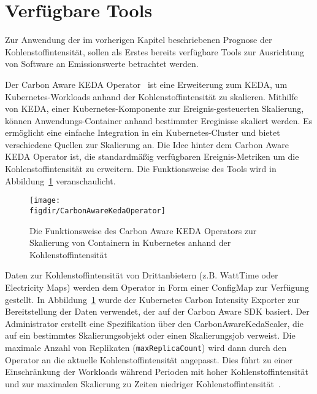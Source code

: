 \section{Verfügbare Tools}\label{CAP:tools}
Zur Anwendung der im vorherigen Kapitel beschriebenen Prognose der Kohlenstoffintensität, sollen als Erstes bereits verfügbare Tools zur Ausrichtung von Software an Emissionswerte betrachtet werden.

Der Carbon Aware KEDA Operator~\cite{Azure.20240321T11:03:47.000Z} ist eine Erweiterung zum \ac{KEDA}, um Kubernetes-Workloads anhand der Kohlenstoffintensität zu skalieren.
Mithilfe von \ac{KEDA}, einer Kubernetes-Komponente zur Ereignis-gesteuerten Skalierung, können Anwendungs-Container anhand bestimmter Ereginisse skaliert werden.
Es ermöglicht eine einfache Integration in ein Kubernetes-Cluster und bietet verschiedene Quellen zur Skalierung an.
Die Idee hinter dem Carbon Aware \ac{KEDA} Operator ist, die standardmäßig verfügbaren Ereignis-Metriken um die Kohlenstoffintensität zu erweitern.
Die Funktionsweise des Tools wird in Abbildung~\ref{FIG:carbon-aware-keda-operator} veranschaulicht.
\begin{figure}
 \caption{Die Funktionsweise des Carbon Aware KEDA Operators zur Skalierung von Containern in Kubernetes anhand der Kohlenstoffintensität~\cite{Azure.20240321T11:03:47.000Z}}
 {\texttt{[image: \\figdir/CarbonAwareKedaOperator]}}
 \label{FIG:carbon-aware-keda-operator}
\end{figure}
Daten zur Kohlenstoffintensität von Drittanbietern (z.B. WattTime oder Electricity Maps) werden dem Operator in Form einer ConfigMap zur Verfügung gestellt.
In Abbildung~\ref{FIG:carbon-aware-keda-operator} wurde der Kubernetes Carbon Intensity Exporter zur Bereitstellung der Daten verwendet, der auf der Carbon Aware \ac{SDK} basiert.
Der Administrator erstellt eine Spezifikation über den CarbonAwareKedaScaler, die auf ein bestimmtes Skalierungsobjekt oder einen Skalierungsjob verweist.
Die maximale Anzahl von Replikaten (\lstinline[columns=fixed]{maxReplicaCount}) wird dann durch den Operator an die aktuelle Kohlenstoffintensität angepasst.
Dies führt zu einer Einschränkung der Workloads während Perioden mit hoher Kohlenstoffintensität und zur maximalen Skalierung zu Zeiten niedriger Kohlenstoffintensität~\cite{Azure.20240321T11:03:47.000Z}.

